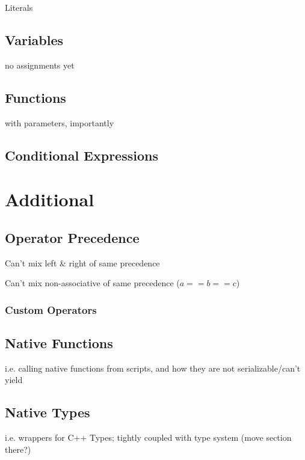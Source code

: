             Literals
        
        \subsection{Variables}
            
            no assignments yet
        
        \subsection{Functions}
        
            with parameters, importantly
        
        \subsection{Conditional Expressions}
    
    \section{Additional}
        
        \subsection{Operator Precedence}
            Can't mix left \& right of same precedence
            
            Can't mix non-associative of same precedence ($a==b==c$)
            \subsubsection{Custom Operators}
    
        \subsection{Native Functions}
        
            i.e. calling native functions from scripts, and how they are not serializable/can't yield
        
        \subsection{Native Types}
            i.e. wrappers for C++ Types; tightly coupled with type system (move section there?)
    
